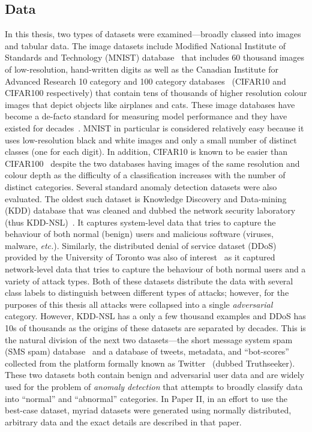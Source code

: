 \subsection{Data}
\label{subsec:methods-data}
In this thesis, two types of datasets were examined---broadly classed into images and tabular data. 
The image datasets include Modified National Institute of Standards and Technology (MNIST) database~\cite{mnist} that includes 60 thousand images of low-resolution, hand-written digits as well as the Canadian Institute for Advanced Research 10  category and 100 category databases~\cite{cifar} (CIFAR10 and CIFAR100 respectively) that contain tens of thousands of higher resolution colour images that depict objects like airplanes and cats. 
These image databases have become a de-facto standard for measuring model performance and they have existed for decades~\cite{mnist,cifar}. 
MNIST in particular is considered relatively easy because it uses low-resolution black and white images and only a small number of distinct classes (one for each digit). 
In addition, CIFAR10 is known to be easier than CIFAR100~\cite{shalev2014understanding,dohmatob_generalized_2019} despite the two databases having images of the same resolution and colour depth as the difficulty of a classification increases with the number of distinct categories. 
Several standard anomaly detection datasets were also evaluated. 
The oldest such dataset is Knowledge Discovery and Data-mining (KDD) database that was cleaned and dubbed the network security laboratory (thus KDD-NSL)~\cite{kdd-nsl}. 
It captures system-level data that tries to capture the behaviour of both normal (benign) users and malicious software (viruses, malware, \textit{etc.}). Similarly, the distributed denial of service dataset (DDoS) provided by the University of Toronto was also of interest~\cite{ddos} as it captured network-level data that tries to capture the behaviour of both normal users and a variety of attack types. 
Both of these datasets distribute the data with several class labels to distinguish between different types of attacks; however, for the purposes of this thesis all attacks were collapsed into a single \textit{adversarial} category. 
However, KDD-NSL has a only a few thousand examples and DDoS has 10s of thousands as the origins of these datasets are separated by decades. 
This is the natural division of the next two datasets---the short message system spam (SMS spam) database~\cite{sms_spam} and a database of tweets, metadata, and ``bot-scores'' collected from the platform formally known as Twitter~\cite{truthseeker} (dubbed Truthseeker). 
These two datasets both contain benign and adversarial user data and are widely used for the problem of \textit{anomaly detection} that attempts to broadly classify data into ``normal'' and ``abnormal'' categories. 
In Paper II, in an effort to use the best-case dataset, myriad datasets were generated using normally distributed, arbitrary data and the exact details are described in that paper.

